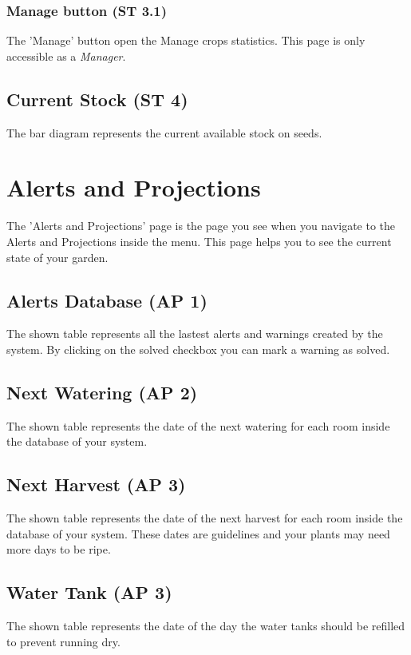 \subsubsection{Manage button (ST 3.1)}
The 'Manage' button open the Manage crops statistics. This page is only accessible as a \emph{Manager}.


\subsection{Current Stock (ST 4)}
The bar diagram represents the current available stock on seeds.





\newpage
\section{Alerts and Projections}
\label{sec:appendix_AlertsPrejections}
\mbox{} \par
\noindent{}

The 'Alerts and Projections' page is the  page you see when you navigate to the
Alerts and Projections inside the menu. This page helps you to see the current
state of your garden.

\subsection{Alerts Database (AP 1)}
The shown table represents all the lastest alerts and warnings created by the
system. By clicking on the solved checkbox you can mark a warning as solved.

\subsection{Next Watering (AP 2)}
The shown table represents the date of the next watering for each room inside
the database of your system.

\subsection{Next Harvest (AP 3)}
The shown table represents the date of the next harvest for each room inside
the database of your system. These dates are guidelines and your plants may need
more days to be ripe.

\subsection{Water Tank (AP 3)}
The shown table represents the date of the day the water tanks should be
refilled to prevent running dry.





